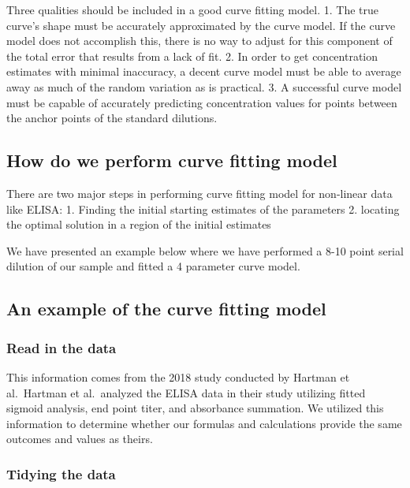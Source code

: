 \documentclass[
]{book}
\begin{document}
Three qualities should be included in a good curve fitting model.
1. The true curve's shape must be accurately approximated by the curve model. If the curve model does not accomplish this, there is no way to adjust for this component of the total error that results from a lack of fit.
2. In order to get concentration estimates with minimal inaccuracy, a decent curve model must be able to average away as much of the random variation as is practical. 3. A successful curve model must be capable of accurately predicting concentration values for points between the anchor points of the standard dilutions.

\hypertarget{how-do-we-perform-curve-fitting-model}{%
\subsection{How do we perform curve fitting model}\label{how-do-we-perform-curve-fitting-model}}

There are two major steps in performing curve fitting model for non-linear data like ELISA:
1. Finding the initial starting estimates of the parameters
2. locating the optimal solution in a region of the initial estimates

We have presented an example below where we have performed a 8-10 point serial dilution of our sample and fitted a 4 parameter curve model.

\hypertarget{an-example-of-the-curve-fitting-model}{%
\subsection{An example of the curve fitting model}\label{an-example-of-the-curve-fitting-model}}

\hypertarget{read-in-the-data}{%
\subsubsection{Read in the data}\label{read-in-the-data}}

This information comes from the 2018 study conducted by Hartman et al.~Hartman et al.~analyzed the ELISA data in their study utilizing fitted sigmoid analysis, end point titer, and absorbance summation. We utilized this information to determine whether our formulas and calculations provide the same outcomes and values as theirs.

\hypertarget{tidying-the-data}{%
\subsubsection{Tidying the data}\label{tidying-the-data}}
\end{document}
